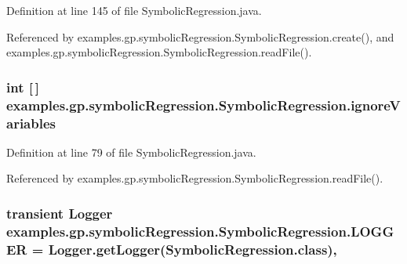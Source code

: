 Definition at line 145 of file Symbolic\-Regression.\-java.



Referenced by examples.\-gp.\-symbolic\-Regression.\-Symbolic\-Regression.\-create(), and examples.\-gp.\-symbolic\-Regression.\-Symbolic\-Regression.\-read\-File().

\hypertarget{classexamples_1_1gp_1_1symbolic_regression_1_1_symbolic_regression_a24561bfc8adbe85f6e6ce74fcd008602}{
\subsubsection[{ignore\-Variables}]{\setlength{\rightskip}{0pt plus 5cm}int \mbox{[}$\,$\mbox{]} examples.\-gp.\-symbolic\-Regression.\-Symbolic\-Regression.\-ignore\-Variables\hspace{0.3cm}{\ttfamily [static]}}}\label{classexamples_1_1gp_1_1symbolic_regression_1_1_symbolic_regression_a24561bfc8adbe85f6e6ce74fcd008602}


Definition at line 79 of file Symbolic\-Regression.\-java.



Referenced by examples.\-gp.\-symbolic\-Regression.\-Symbolic\-Regression.\-read\-File().

\hypertarget{classexamples_1_1gp_1_1symbolic_regression_1_1_symbolic_regression_ab88310d97fc6498dd4e71bf3508f73fd}{
\subsubsection[{L\-O\-G\-G\-E\-R}]{\setlength{\rightskip}{0pt plus 5cm}transient Logger examples.\-gp.\-symbolic\-Regression.\-Symbolic\-Regression.\-L\-O\-G\-G\-E\-R = Logger.\-get\-Logger(Symbolic\-Regression.\-class)\hspace{0.3cm}{\ttfamily [static]}, {\ttfamily [private]}}}\label{classexamples_1_1gp_1_1symbolic_regression_1_1_symbolic_regression_ab88310d97fc6498dd4e71bf3508f73fd}


